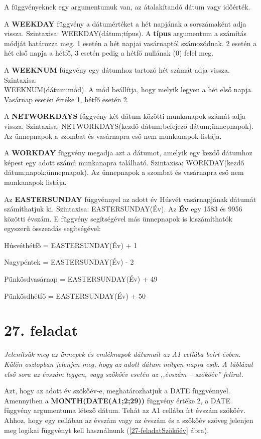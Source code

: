 A függvényeknek egy argumentumuk van, az átalakítandó dátum
vagy időérték.

A \textbf{WEEKDAY} függvény a dátumértéket a hét napjának
a sorszámaként adja vissza. Szintaxisa: WEEKDAY(dátum;típus). A
\textbf{típus} argumentum a számítás módját határozza
meg. 1 esetén a hét napjai vasárnaptól számozódnak. 2
esetén a hét első napja a hétfő, 3 esetén pedig a
hétfő nullának (0) felel meg.

A \textbf{WEEKNUM} függvény egy dátumhoz tartozó hét
számát adja vissza. Szintaxisa:\\
WEEKNUM(dátum;mód). A mód
beállítja, hogy melyik legyen a hét első napja. Vasárnap
esetén értéke 1, hétfő esetén 2.

A \textbf{NETWORKDAYS} függvény két dátum közötti munkanapok
számát adja vissza. Szintaxisa: NETWORKDAYS(kezdő
dátum;befejező dátum;ünnepnapok). Az ünnepnapok a szombat
és vasárnapra eső nem munkanapok listája. 

A \textbf{WORKDAY} függvény megadja azt a dátumot, amelyik egy
kezdő dátumhoz képest egy adott számú munkanapra
található. Szintaxisa: WORKDAY(kezdő
dátum;napok;ünnepnapok). Az ünnepnapok a szombat és
vasárnapra eső nem munkanapok listája.

Az \textbf{EASTERSUNDAY }függvénnyel az adott év Húsvét
vasárnapjának dátumát számíthatjuk ki. Szintaxisa:
EASTERSUNDAY(Év).  Az \textbf{Év} egy 1583 és 9956 közötti
évszám. E függvény segítségével más ünnepnapok is
kiszámíthatók egyszerű összeadás segítségével:

Húsvéthétfő = EASTERSUNDAY(Év) + 1

Nagypéntek = EASTERSUNDAY(Év) - 2

Pünkösdvasárnap = EASTERSUNDAY(Év) + 49

Pünkösdhétfő = EASTERSUNDAY(Év) + 50


\section{27. feladat}

{\itshape
Jelenítsük meg az ünnepek és emléknapok dátumait az A1
cellába beírt évben. Külön oszlopban jelenjen meg, hogy az
adott dátum milyen napra esik. A táblázat első sora az
évszám legyen, vagy szökőév esetén az ,,évszám -- szökőév''
felirat.}

Azt, hogy az adott év szökőév-e, meghatározhatjuk a DATE
függvénnyel. Amennyiben a
{\sffamily\bfseries{MONTH(DATE(A1;2;29))}} függvény értéke 2,
a DATE függvény argumentuma
létező dátum. Tehát az A1 cellába írt évszám
szökőév. Ahhoz, hogy egy cellában az évszám vagy az
évszám és a szökőév szöveg jelenjen meg logikai
függvényt kell használnunk (\ref{27-feladatSzökőév} ábra).

